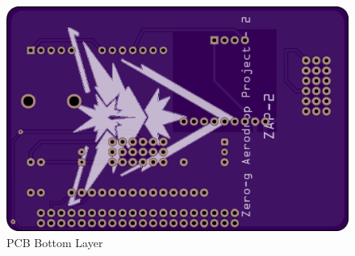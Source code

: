 \begin{figure}[H]
  \centering
  \includegraphics[width=0.75\linewidth]{Controls/PCB_bottom.png}
  \caption{\label{fig:PCB_bottom}PCB Bottom Layer}
\end{figure}